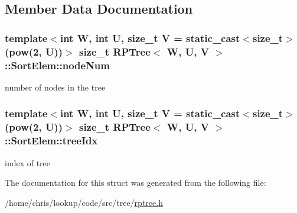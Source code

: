 \subsection{Member Data Documentation}
\hypertarget{structRPTree_1_1SortElem_a01afd7ad0ab2b99cfc8452e1adb9b27d}{
\subsubsection[{node\-Num}]{\setlength{\rightskip}{0pt plus 5cm}template$<$int W, int U, size\-\_\-t V = static\-\_\-cast$<$size\-\_\-t$>$(pow(2, U))$>$ size\-\_\-t {\bf R\-P\-Tree}$<$ {\bf W}, U, V $>$\-::Sort\-Elem\-::node\-Num}}\label{structRPTree_1_1SortElem_a01afd7ad0ab2b99cfc8452e1adb9b27d}


number of nodes in the tree 

\hypertarget{structRPTree_1_1SortElem_a9d1b22375e2f64c3663d55f5c278ae02}{
\subsubsection[{tree\-Idx}]{\setlength{\rightskip}{0pt plus 5cm}template$<$int W, int U, size\-\_\-t V = static\-\_\-cast$<$size\-\_\-t$>$(pow(2, U))$>$ size\-\_\-t {\bf R\-P\-Tree}$<$ {\bf W}, U, V $>$\-::Sort\-Elem\-::tree\-Idx}}\label{structRPTree_1_1SortElem_a9d1b22375e2f64c3663d55f5c278ae02}


index of tree 



The documentation for this struct was generated from the following file\-:\begin{DoxyCompactItemize}
\item 
/home/chris/lookup/code/src/tree/\hyperlink{rptree_8h}{rptree.\-h}\end{DoxyCompactItemize}
